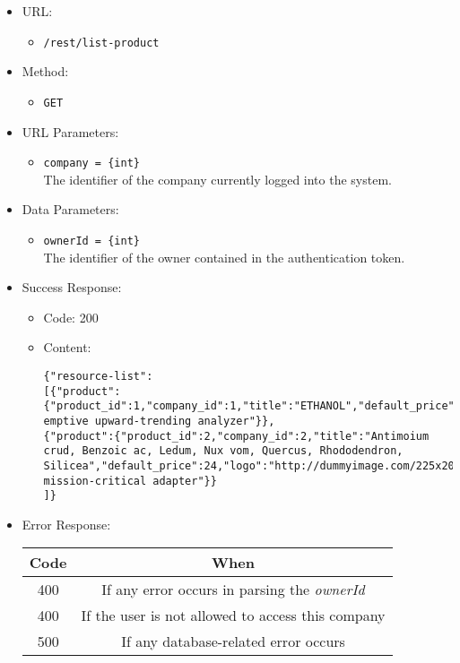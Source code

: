 \begin{itemize}
    
    \item URL: 
    \begin{itemize}
        \item \texttt{/rest/list-product}
    \end{itemize}
    
    \item Method: 
    \begin{itemize}
        \item \texttt{GET}
    \end{itemize}
    
    \item URL Parameters: 
    \begin{itemize}
        \item \texttt{company = \{int\}} \\
        The identifier of the company currently logged into the system.
    \end{itemize}
    
    \item Data Parameters: 
    \begin{itemize}
        \item \texttt{ownerId = \{int\}} \\
        The identifier of the owner contained in the authentication token.
    \end{itemize}

    \item Success Response: 
    \begin{itemize}
        \item Code: 200
        \item Content:
        \begin{lstlisting}
{"resource-list":
[{"product":{"product_id":1,"company_id":1,"title":"ETHANOL","default_price":29,"logo":"http://dummyimage.com/222x224.png/5fa2dd/ffffff","measurement_unit":"Kg","description":"Pre-emptive upward-trending analyzer"}},
{"product":{"product_id":2,"company_id":2,"title":"Antimoium crud, Benzoic ac, Ledum, Nux vom, Quercus, Rhododendron, Silicea","default_price":24,"logo":"http://dummyimage.com/225x208.png/5fa2dd/ffffff","measurement_unit":"Kg","description":"Ameliorated mission-critical adapter"}}
]}
        \end{lstlisting}    
    \end{itemize}

    \item Error Response:
    \begin{table}[!h]
    \centering 
    \begin{tabular}{|c|c|}
    \hline
    \multicolumn{1}{|c|}{\textbf{Code}} & \multicolumn{1}{c|}{\textbf{When}} \\ \hline
    400 & If any error occurs in parsing the \textit{ownerId}  \\\hline
    400 & If the user is not allowed to access this company \\\hline
    500 & If any database-related error occurs \\\hline
    \end{tabular} 
    \end{table} 
    

\end{itemize}
